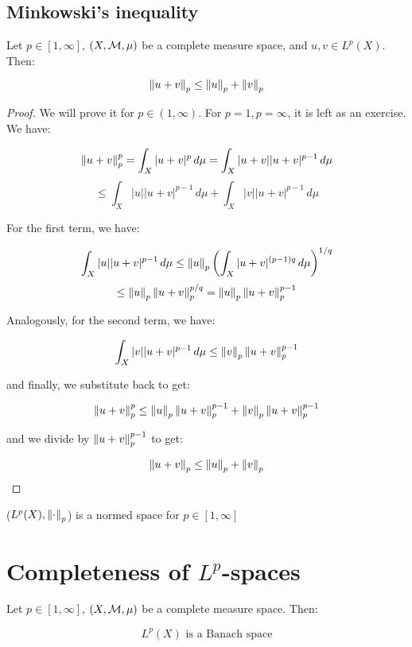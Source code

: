 \subsection{Minkowski's inequality}

\begin{ftheorem}
    Let $p \in [1, \infty]$, $(X, \mathcal{M}, \mu)$ be a complete measure space, and $u, v \in L^p(X)$. Then:

    $$\left\|u + v\right\|_p \leq \left\|u\right\|_p + \left\|v\right\|_p$$
\end{ftheorem}

\begin{proof}
    We will prove it for $p \in (1, \infty)$. For $p = 1, p = \infty$, it is left as an exercise.\\

    We have:

    $$\left\|u + v\right\|_p^p = \int_X |u + v|^p \, d\mu = \int_X |u + v| |u + v|^{p - 1} \, d\mu$$
    $$ \leq \int_X |u| |u + v|^{p - 1} \, d\mu + \int_X |v| |u + v|^{p - 1} \, d\mu$$

    For the first term, we have:

    $$\int_X |u| |u + v|^{p - 1} \, d\mu \leq \left\|u\right\|_p \left( \int_X |u + v|^{(p - 1)q} \, d\mu \right)^{1/q}$$
    $$ \leq \left\|u\right\|_p \left\|u + v\right\|_p^{p/q} = \left\|u\right\|_p \left\|u + v\right\|_p^{p - 1}$$

    Analogously, for the second term, we have:

    $$\int_X |v| |u + v|^{p - 1} \, d\mu \leq \left\|v\right\|_p \left\|u + v\right\|_p^{p - 1}$$

    and finally, we substitute back to get:

    $$\left\|u + v\right\|_p^p \leq \left\|u\right\|_p \left\|u + v\right\|_p^{p - 1} + \left\|v\right\|_p \left\|u + v\right\|_p^{p - 1}$$

    and we divide by $\left\|u + v\right\|_p^{p - 1}$ to get:

    $$\left\|u + v\right\|_p \leq \left\|u\right\|_p + \left\|v\right\|_p$$
\end{proof}

\begin{fcorollary}
    ($L^p(X), \left\|\cdot\right\|_p$) is a normed space for $p \in [1, \infty]$
\end{fcorollary}

\section{Completeness of $L^p$-spaces}

\begin{ftheorem}
    Let $p \in [1, \infty]$, $(X, \mathcal{M}, \mu)$ be a complete measure space. Then:

    $$L^p(X) \text{ is a Banach space}$$
\end{ftheorem}

